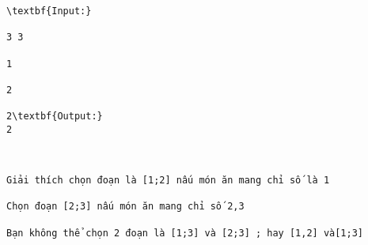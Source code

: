 \begin{verbatim}
\textbf{Input:}

3 3

1

2

2\textbf{Output:}
2\end{verbatim}
\begin{verbatim}


Giải thích chọn đoạn là [1;2] nấu món ăn mang chỉ số là 1

Chọn đoạn [2;3] nấu món ăn mang chỉ số 2,3

Bạn không thể chọn 2 đoạn là [1;3] và [2;3] ; hay [1,2] và[1;3]\end{verbatim}